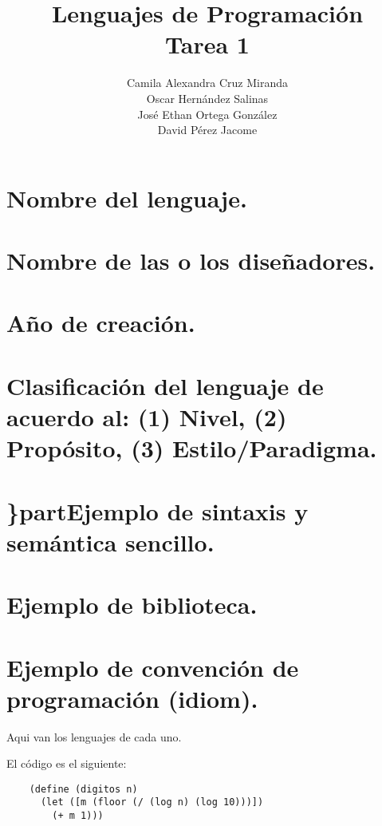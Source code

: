 \documentclass[answers]{exam}
\title{
  \huge Lenguajes de Programación \\[0.5cm]
  \LARGE Tarea 1
}
\author{
  Camila Alexandra Cruz Miranda \\
  Oscar Hernández Salinas \\
  José Ethan Ortega González \\
  David Pérez Jacome \\
}
\begin{document}
\maketitle{}
\begin{questions}
  \begin{parts}
    \part{Nombre del lenguaje.}
    \part{Nombre de las o los diseñadores.}
    \part{Año de creación.}
    \part{Clasificación del lenguaje de acuerdo al: (1) Nivel, (2) Propósito,
      (3) Estilo/Paradigma.}
    \part{\}part{Ejemplo de sintaxis y semántica sencillo.}}
    \part{Ejemplo de biblioteca.}
    \part{Ejemplo de convención de programación (idiom).}
  \end{parts}
  \begin{solution}
    Aqui van los lenguajes de cada uno.
  \end{solution}

  \begin{solution}
    El código es el siguiente:
    \begin{verbatim}
    (define (digitos n)
      (let ([m (floor (/ (log n) (log 10)))])
        (+ m 1)))
    \end{verbatim}
  \end{solution}


\end{questions}
\end{document}
